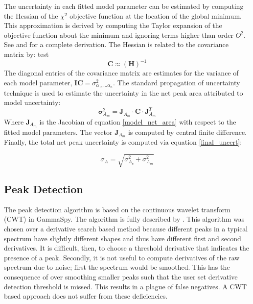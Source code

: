 \documentclass[10pt]{article}
\begin{document}
The uncertainty in each fitted model parameter can be estimated by computing the Hessian of the $\chi^2$ objective
 function at the location of the global minimum.  This approximation is derived by computing the Taylor expansion of the objective function about
 the minimum and ignoring terms higher than order $O^2$.  See \cite{cvonline:2017} and \cite{gavin:2017} for a complete derivation.
The Hessian is related to the covariance matrix by: test
\begin{equation}
   \bm C \approx (\bm H)^{-1}
\end{equation}
The diagonal entries of the covariance matrix are estimates for the variance of each model parameter,
$\bm I \bm C = \sigma_{\alpha_1, ... \alpha_n}^2$.
The standard propagation of uncertainty technique is used to estimate the uncertainty in the net
peak area attributed to model uncertainty:
\begin{equation}
    \bm \sigma^2_{A_m} = \bm J_{A_m} \cdot \bm C  \cdot \bm J_{A_m}^T
\end{equation}
Where $\bm J_{A_m}$ is the Jacobian of equation \ref{model_net_area} with respect to the fitted model parameters.  The
vector $\bm J_{A_m}$ is computed by central finite difference. \\

Finally, the total net peak uncertainty is computed via equation \ref{final_uncert}:

\begin{equation}
    \sigma_A = \sqrt{\sigma_{A_c}^2 + \sigma_{A_m}^2}
    \label{final_uncert}
\end{equation}

\subsection{Peak Detection}

The peak detection algorithm is based on the continuous wavelet transform (CWT) in GammaSpy.
The algorithm is fully described by \cite{Du:2006}.
This algorithm was chosen over a derivative search based method because different peaks
in a typical spectrum have slightly different shapes and thus have different first and
second derivatives.  It is difficult, then, to choose a threshold derivative that indicates
the presence of a peak.  Secondly, it is not useful to compute derivatives of the raw
spectrum due to noise; first the spectrum would be smoothed.  This has the consequence of
over smoothing smaller peaks such that the user set derivative detection threshold
is missed.  This results in a plague of false negatives. 
A CWT based approach does not suffer from these deficiencies. \\
\end{document}
